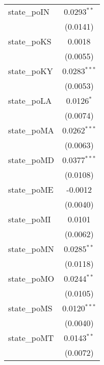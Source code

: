 \begin{tabular}{lc}
   state\_poIN                                        & 0.0293$^{**}$\\   
                                                      & (0.0141)\\   
   state\_poKS                                        & 0.0018\\   
                                                      & (0.0055)\\   
   state\_poKY                                        & 0.0283$^{***}$\\   
                                                      & (0.0053)\\   
   state\_poLA                                        & 0.0126$^{*}$\\   
                                                      & (0.0074)\\   
   state\_poMA                                        & 0.0262$^{***}$\\   
                                                      & (0.0063)\\   
   state\_poMD                                        & 0.0377$^{***}$\\   
                                                      & (0.0108)\\   
   state\_poME                                        & -0.0012\\   
                                                      & (0.0040)\\   
   state\_poMI                                        & 0.0101\\   
                                                      & (0.0062)\\   
   state\_poMN                                        & 0.0285$^{**}$\\   
                                                      & (0.0118)\\   
   state\_poMO                                        & 0.0244$^{**}$\\   
                                                      & (0.0105)\\   
   state\_poMS                                        & 0.0120$^{***}$\\   
                                                      & (0.0040)\\   
   state\_poMT                                        & 0.0143$^{**}$\\   
                                                      & (0.0072)\\   

\end{tabular}
